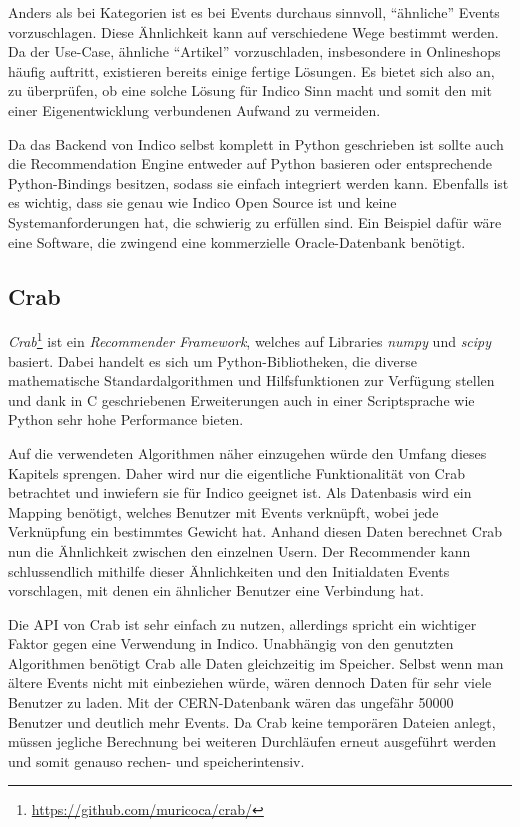 Anders als bei Kategorien ist es bei Events durchaus sinnvoll, \enquote{ähnliche} Events
vorzuschlagen. Diese Ähnlichkeit kann auf verschiedene Wege bestimmt werden. Da der Use-Case,
ähnliche \enquote{Artikel} vorzuschladen, insbesondere in Onlineshops häufig auftritt, existieren
bereits einige fertige Lösungen. Es bietet sich also an, zu überprüfen, ob eine solche Lösung für
Indico Sinn macht und somit den mit einer Eigenentwicklung verbundenen Aufwand zu vermeiden.

Da das Backend von Indico selbst komplett in Python geschrieben ist sollte auch die Recommendation
Engine entweder auf Python basieren oder entsprechende Python-Bindings besitzen, sodass sie einfach
integriert werden kann. Ebenfalls ist es wichtig, dass sie genau wie Indico Open Source ist und
keine Systemanforderungen hat, die schwierig zu erfüllen sind. Ein Beispiel dafür wäre eine
Software, die zwingend eine kommerzielle Oracle-Datenbank benötigt.


\subsection{Crab}

\emph{Crab}\footnote{\href{https://github.com/muricoca/crab/}{https://github.com/muricoca/crab/}}
ist ein \emph{Recommender Framework}, welches auf Libraries \emph{numpy} und \emph{scipy} basiert.
Dabei handelt es sich um Python-Bibliotheken, die diverse mathematische Standardalgorithmen und
Hilfsfunktionen zur Verfügung stellen und dank in C geschriebenen Erweiterungen auch in einer
Scriptsprache wie Python sehr hohe Performance bieten.

Auf die verwendeten Algorithmen näher einzugehen würde den Umfang dieses Kapitels sprengen. Daher
wird nur die eigentliche Funktionalität von Crab betrachtet und inwiefern sie für Indico geeignet
ist. Als Datenbasis wird ein Mapping benötigt, welches Benutzer mit Events verknüpft, wobei jede
Verknüpfung ein bestimmtes Gewicht hat. Anhand diesen Daten berechnet Crab nun die Ähnlichkeit
zwischen den einzelnen Usern. Der Recommender kann schlussendlich mithilfe dieser Ähnlichkeiten und
den Initialdaten Events vorschlagen, mit denen ein ähnlicher Benutzer eine Verbindung hat.

Die API von Crab ist sehr einfach zu nutzen, allerdings spricht ein wichtiger Faktor gegen eine
Verwendung in Indico. Unabhängig von den genutzten Algorithmen benötigt Crab alle Daten gleichzeitig
im Speicher.  Selbst wenn man ältere Events nicht mit einbeziehen würde, wären dennoch Daten für
sehr viele Benutzer zu laden. Mit der CERN-Datenbank wären das ungefähr 50000 Benutzer und deutlich
mehr Events. Da Crab keine temporären Dateien anlegt, müssen jegliche Berechnung bei weiteren
Durchläufen erneut ausgeführt werden und somit genauso rechen- und speicherintensiv.


